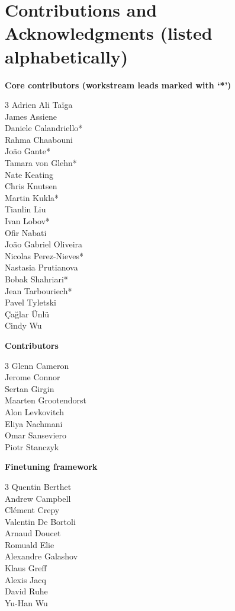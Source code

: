 \section*{Contributions and Acknowledgments (listed alphabetically)}
\label{sec:contributions}

\noindent\textbf{Core contributors (workstream leads marked with ‘*’)}

\begin{multicols}{3}
\noindent
Adrien Ali Taïga \\ 
James Assiene \\ 
Daniele Calandriello* \\ 
Rahma Chaabouni \\ 
João Gante*  \\ 
Tamara von Glehn* \\ 
Nate Keating \\ 
Chris Knutsen \\ 
Martin Kukla* \\ 
Tianlin Liu \\ 
Ivan Lobov* \\ 
Ofir Nabati \\ 
João Gabriel Oliveira \\ 
Nicolas Perez-Nieves* \\ 
Nastasia Prutianova \\ 
Bobak Shahriari* \\ 
Jean Tarbouriech* \\ 
Pavel Tyletski \\ 
Çağlar Ünlü \\ 
Cindy Wu
\end{multicols}

\noindent\textbf{Contributors}

\begin{multicols}{3}
\noindent
Glenn Cameron \\ 
Jerome Connor \\ 
Sertan Girgin \\ 
Maarten Grootendorst \\ 
Alon Levkovitch \\ 
Eliya Nachmani \\ 
Omar Sanseviero \\ 
Piotr Stanczyk
\end{multicols}

\noindent\textbf{Finetuning framework}

\begin{multicols}{3}
\noindent
Quentin Berthet \\ 
Andrew Campbell \\ 
Clément Crepy \\ 
Valentin De Bortoli \\ 
Arnaud Doucet \\ 
Romuald Elie \\ 
Alexandre Galashov \\ 
Klaus Greff \\ 
Alexis Jacq \\ 
David Ruhe \\ 
Yu-Han Wu
\end{multicols}

